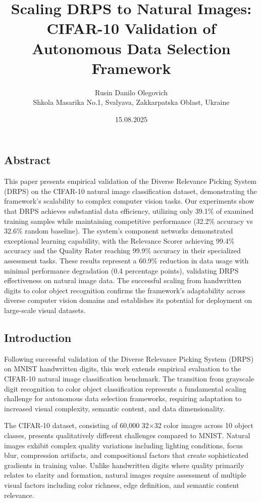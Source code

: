 \documentclass[12pt]{article}
\title{Scaling DRPS to Natural Images: \\CIFAR-10 Validation of Autonomous Data Selection Framework}
\author{Rusin Danilo Olegovich\\Shkola Masarika No.1, Svalyava, Zakkarpatska Oblast, Ukraine}
\date{15.08.2025}
\begin{document}
\maketitle

\subsection{Abstract}\label{abstract}

This paper presents empirical validation of the Diverse Relevance Picking System (DRPS) on the CIFAR-10 natural image classification dataset, demonstrating the framework's scalability to complex computer vision tasks. Our experiments show that DRPS achieves substantial data efficiency, utilizing only 39.1\% of examined training samples while maintaining competitive performance (32.2\% accuracy vs 32.6\% random baseline). The system's component networks demonstrated exceptional learning capability, with the Relevance Scorer achieving 99.4\% accuracy and the Quality Rater reaching 99.9\% accuracy in their specialized assessment tasks. These results represent a 60.9\% reduction in data usage with minimal performance degradation (0.4 percentage points), validating DRPS effectiveness on natural image data. The successful scaling from handwritten digits to color object recognition confirms the framework's adaptability across diverse computer vision domains and establishes its potential for deployment on large-scale visual datasets.

\subsection{Introduction}\label{introduction}

Following successful validation of the Diverse Relevance Picking System (DRPS) on MNIST handwritten digits, this work extends empirical evaluation to the CIFAR-10 natural image classification benchmark. The transition from grayscale digit recognition to color object classification represents a fundamental scaling challenge for autonomous data selection frameworks, requiring adaptation to increased visual complexity, semantic content, and data dimensionality.

The CIFAR-10 dataset, consisting of 60,000 32×32 color images across 10 object classes, presents qualitatively different challenges compared to MNIST. Natural images exhibit complex quality variations including lighting conditions, focus blur, compression artifacts, and compositional factors that create sophisticated gradients in training value. Unlike handwritten digits where quality primarily relates to clarity and formation, natural images require assessment of multiple visual factors including color richness, edge definition, and semantic content relevance.
\end{document}
